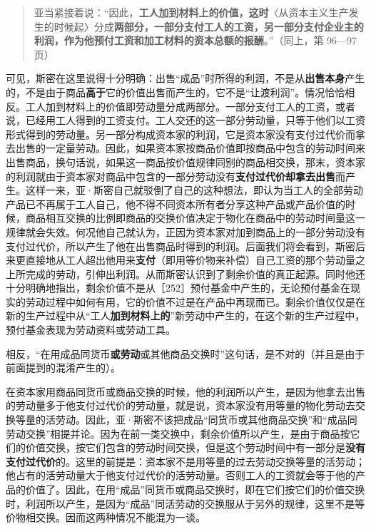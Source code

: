 \begin{quote}亚当紧接着说：“因此，\textbf{工人加到材料上的价值，这时}〈从资本主义生产发生的时候起〉分成\textbf{两部分，一部分支付工人的工资，另一部分支付企业主的利润，作为他预付工资和加工材料的资本总额的报酬}。”（同上，第 96—97 页）\end{quote}

可见，斯密在这里说得十分明确：出售“成品”时所得的利润，不是从\textbf{出售本身}产生的，不是由于商品\textbf{高于}它的价值出售而产生的，它不是“让渡利润”。情况恰恰相反。工人加到材料上的价值即劳动量分成两部分。一部分支付工人的工资，或者说，已经用工人得到的工资支付。工人交还的这一部分劳动量，只等于他们以工资形式得到的劳动量。另一部分构成资本家的利润，它是资本家没有支付过代价而拿去出售的一定量劳动。因此，如果资本家按商品价值即按商品中包含的劳动时间来出售商品，换句话说，如果这一商品按价值规律同别的商品相交换，那末，资本家的利润就由于资本家对商品中包含的一部分劳动没有\textbf{支付过代价却拿去出售}而产生。这样一来，亚·斯密自己就驳倒了自己的这种想法，即认为当工人的全部劳动产品已不再属于工人自己，他不得不同资本所有者分享这种产品或产品价值的时候，商品相互交换的比例即商品的交换价值决定于物化在商品中的劳动时间量这一规律就会失效。何况他自己就认为，正因为资本家对加到商品上的一部分劳动没有支付过代价，所以产生了他在出售商品时得到的利润。后面我们将会看到，斯密后来更直接地从工人超出他用来\textbf{支付}（即用等价物来补偿）自己工资的那个劳动量之上所完成的劳动，引伸出利润。从而斯密认识到了剩余价值的真正起源。同时他还十分明确地指出，剩余价值不是从［252］预付基金中产生的，无论预付基金在现实的劳动过程中如何有用，它的价值不过是在产品中再现而已。剩余价值仅仅是在新的生产过程中从“工人\textbf{加到材料上的}”新劳动中产生的，在这个新的生产过程中，预付基金表现为劳动资料或劳动工具。

相反，“在用成品同货币\textbf{或劳动}或其他商品交换时”这句话，是不对的（并且是由于前面提到的混淆产生的）。

在资本家用商品同货币或商品交换的时候，他的利润所以产生，是因为他拿去出售的劳动量多于他支付过代价的劳动量，就是说，资本家没有用等量的物化劳动去交换等量的活劳动。因此，亚·斯密不该把成品“同货币或其他商品交换”和“成品同劳动交换”相提并论。因为在前一类交换中，剩余价值所以产生，是由于商品按它们的价值交换，按它们包含的劳动时间交换，但是这个劳动时间中有一部分是\textbf{没有支付过代价}的。这里的前提是：资本家不是用等量的过去劳动交换等量的活劳动；他占有的活劳动量大于他支付过代价的活劳动量。否则工人的工资就会等于他的产品的价值了。因此，在用“成品”同货币或商品交换时，即在它们按它们的价值交换时，利润所以产生，是因为“成品”同活劳动的交换服从于另外的规律，这里不是等价物相交换。因而这两种情况不能混为一谈。

